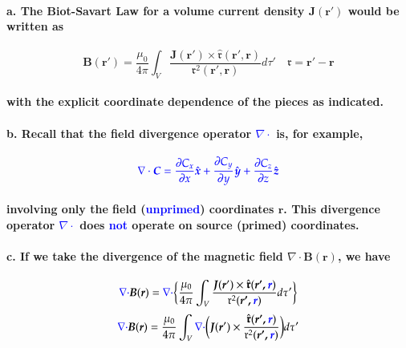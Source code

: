 \documentclass{article}
\begin{document}
\paragraph{\indent a. The Biot-Savart Law for a volume current density $\boldsymbol{J}(\boldsymbol{r}')$ would be written as}
\begin{equation*}
    \boldsymbol{B}(\boldsymbol{r}')=\frac{\mu_0}{4\pi}\int_V\frac{\boldsymbol{J}(\boldsymbol{r}')\times\hat{\boldsymbol{\mathfrak{r}}}(\boldsymbol{r',r})}{\mathfrak{r}^2(\boldsymbol{r',r})}d\tau'\quad \boldsymbol{\mathfrak{r}}=\boldsymbol{r}'-\boldsymbol{r}
\end{equation*}
\paragraph{with the explicit coordinate dependence of the pieces as indicated.}
\paragraph{\indent b. Recall that the field divergence operator \textcolor{blue}{$\nabla\cdot$} is, for example,}
\begin{equation*}
    \textcolor{blue}{\nabla\cdot\boldsymbol{C}=\frac{\partial C_x}{\partial x}\hat{\boldsymbol{x}}+\frac{\partial C_y}{\partial y}\hat{\boldsymbol{y}}+\frac{\partial C_z}{\partial z}\hat{\boldsymbol{z}}}
\end{equation*}
\paragraph{involving only the field (\textcolor{blue}{unprimed}) coordinates $\boldsymbol{r}$. This divergence operator \textcolor{blue}{$\nabla\cdot$} does \textcolor{blue}{not} operate on source (primed) coordinates.}
\paragraph{\indent c. If we take the divergence of the magnetic field $\nabla\cdot \boldsymbol{B}(\boldsymbol{r})$, we have}
\begin{equation*}
    \textcolor{blue}{\nabla\cdot} \boldsymbol{B}(\boldsymbol{r})=\textcolor{blue}{\nabla\cdot} \bigg\{ \frac{\mu_0}{4\pi}\int_V\frac{\boldsymbol{J}(\boldsymbol{r}')\times\hat{\boldsymbol{\mathfrak{r}}}(\boldsymbol{r',\textcolor{blue}{r}})}{\mathfrak{r}^2(\boldsymbol{r',\textcolor{blue}{r}})}d\tau'\bigg\}
\end{equation*}
\begin{equation*}
    \textcolor{blue}{\nabla\cdot} \boldsymbol{B}(\boldsymbol{r})=\frac{\mu_0}{4\pi}\int_V\textcolor{blue}{\nabla\cdot}\bigg(\boldsymbol{J}(\boldsymbol{r}')\times\frac{\hat{\boldsymbol{\mathfrak{r}}}(\boldsymbol{r',\textcolor{blue}{r}})}{\mathfrak{r}^2(\boldsymbol{r',\textcolor{blue}{r}})}\bigg)d\tau'
\end{equation*}
\end{document}
